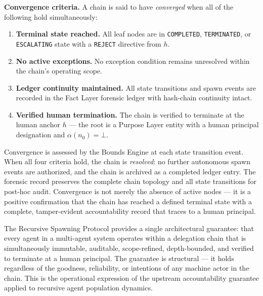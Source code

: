 \medskip
\noindent\textbf{Convergence criteria.} A chain is said to have \emph{converged} when all of the following hold simultaneously:

\begin{enumerate}
    \item[(C1)] \textbf{Terminal state reached.} All leaf nodes are in \texttt{COMPLETED}, \texttt{TERMINATED}, or \texttt{ESCALATING} state with a \texttt{REJECT} directive from $h$.
    \item[(C2)] \textbf{No active exceptions.} No exception condition remains unresolved within the chain's operating scope.
    \item[(C3)] \textbf{Ledger continuity maintained.} All state transitions and spawn events are recorded in the Fact Layer forensic ledger with hash-chain continuity intact.
    \item[(C4)] \textbf{Verified human termination.} The chain is verified to terminate at the human anchor $h$ — the root is a Purpose Layer entity with a human principal designation and $\alpha(n_0) = \bot$.
\end{enumerate}

Convergence is assessed by the Bounds Engine at each state transition event. When all four criteria hold, the chain is \emph{resolved}: no further autonomous spawn events are authorized, and the chain is archived as a completed ledger entry. The forensic record preserves the complete chain topology and all state transitions for post-hoc audit. Convergence is not merely the absence of active nodes — it is a positive confirmation that the chain has reached a defined terminal state with a complete, tamper-evident accountability record that traces to a human principal.

\bigskip

\noindent The Recursive Spawning Protocol provides a single architectural guarantee: that every agent in a multi-agent system operates within a delegation chain that is simultaneously immutable, auditable, scope-refined, depth-bounded, and verified to terminate at a human principal. The guarantee is structural — it holds regardless of the goodness, reliability, or intentions of any machine actor in the chain. This is the operational expression of the upstream \bxthree{} accountability guarantee applied to recursive agent population dynamics.